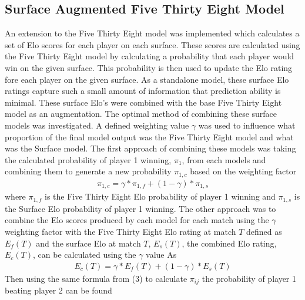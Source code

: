 \documentclass[12pt,a4paper]{article}
\begin{document}
\subsection{Surface Augmented Five Thirty Eight Model}
An extension to the Five Thirty Eight model was implemented which calculates a set of
Elo scores for each player on each surface. These scores are calculated using the
Five Thirty Eight model by calculating a probability that each player would win on the
given surface. This probability is then used to update the Elo rating fore each player
on the given surface. As a standalone model, these surface Elo ratings capture such a
small amount of information that prediction ability is minimal. These surface Elo's were
combined with the base Five Thirty Eight model as an augmentation.
The optimal method of combining these surface models was investigated. A defined weighting
value $\gamma$ was used to influence what proportion of the final model output was
the Five Thirty Eight model and what was the Surface model. The first approach of
combining these models was taking the calculated probability of player 1 winning, $\pi_1$,
from each models and combining them to generate a new probability $\pi_{1,c}$ based
on the weighting factor
\begin{gather}
  \pi_{1,c} = \gamma*\pi_{1,f} + (1-\gamma)*\pi_{1,s}
\end{gather}
where $\pi_{1,f}$ is the Five Thirty Eight Elo probability of player 1 winning and
$\pi_{1,s}$ is the Surface Elo probability of player 1 winning.
The other approach was to combine the Elo scores produced by each model for each match
using the $\gamma$ weighting factor with the Five Thirty Eight Elo rating at match $T$
defined as $E_{f}(T)$ and the surface Elo at match $T$, $E_{s}(T)$,
the combined Elo rating, $E_{c}(T)$, can be calculated using the $\gamma$ value As
\begin{gather}
  E_{c}(T) = \gamma*E_{f}(T) + (1-\gamma)*E_{s}(T)
\end{gather}
Then using the same formula from (3) to calculate $\pi_{ij}$ the probability of player
1 beating player 2 can be found
\clearpage
\end{document}
